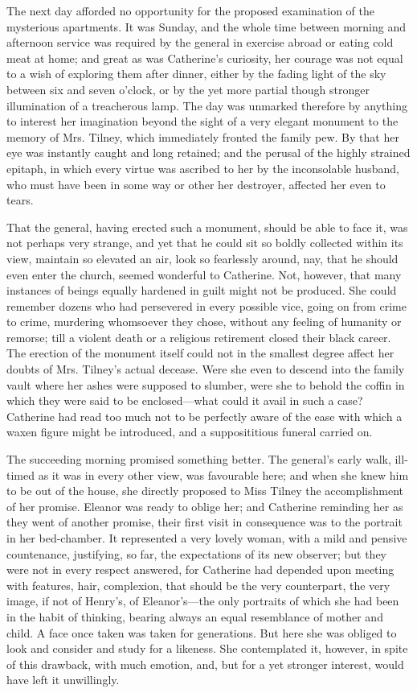 The next day afforded no opportunity for the proposed examination of the mysterious apartments. It was Sunday, and the whole time between morning and afternoon service was required by the general in exercise abroad or eating cold meat at home; and great as was Catherine's curiosity, her courage was not equal to a wish of exploring them after dinner, either by the fading light of the sky between six and seven o'clock, or by the yet more partial though stronger illumination of a treacherous lamp. The day was unmarked therefore by anything to interest her imagination beyond the sight of a very elegant monument to the memory of Mrs. Tilney, which immediately fronted the family pew. By that her eye was instantly caught and long retained; and the perusal of the highly strained epitaph, in which every virtue was ascribed to her by the inconsolable husband, who must have been in some way or other her destroyer, affected her even to tears.

That the general, having erected such a monument, should be able to face it, was not perhaps very strange, and yet that he could sit so boldly collected within its view, maintain so elevated an air, look so fearlessly around, nay, that he should even enter the church, seemed wonderful to Catherine. Not, however, that many instances of beings equally hardened in guilt might not be produced. She could remember dozens who had persevered in every possible vice, going on from crime to crime, murdering whomsoever they chose, without any feeling of humanity or remorse; till a violent death or a religious retirement closed their black career. The erection of the monument itself could not in the smallest degree affect her doubts of Mrs. Tilney's actual decease. Were she even to descend into the family vault where her ashes were supposed to slumber, were she to behold the coffin in which they were said to be enclosed---what could it avail in such a case? Catherine had read too much not to be perfectly aware of the ease with which a waxen figure might be introduced, and a supposititious funeral carried on.

The succeeding morning promised something better. The general's early walk, ill-timed as it was in every other view, was favourable here; and when she knew him to be out of the house, she directly proposed to Miss Tilney the accomplishment of her promise. Eleanor was ready to oblige her; and Catherine reminding her as they went of another promise, their first visit in consequence was to the portrait in her bed-chamber. It represented a very lovely woman, with a mild and pensive countenance, justifying, so far, the expectations of its new observer; but they were not in every respect answered, for Catherine had depended upon meeting with features, hair, complexion, that should be the very counterpart, the very image, if not of Henry's, of Eleanor's---the only portraits of which she had been in the habit of thinking, bearing always an equal resemblance of mother and child. A face once taken was taken for generations. But here she was obliged to look and consider and study for a likeness. She contemplated it, however, in spite of this drawback, with much emotion, and, but for a yet stronger interest, would have left it unwillingly.

